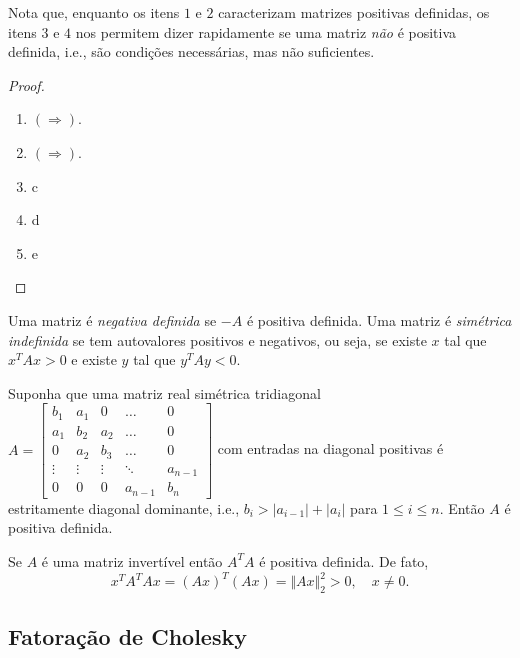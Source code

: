 \documentclass{article}
\begin{document}
Nota que, enquanto os itens \(1\) e \(2\) caracterizam matrizes positivas definidas, os itens \(3\) e \(4\) nos permitem dizer rapidamente se uma matriz \emph{não} é positiva definida, i.e., são condições necessárias, mas não suficientes.

\begin{proof}
    \begin{enumerate}
        \item \((\Rightarrow)\).
        \item \((\Rightarrow)\). 
        \item c
        \item d
        \item e
    \end{enumerate}
\end{proof}

\begin{rem}
    Uma matriz é \emph{negativa definida} se \(-A\) é positiva definida. Uma matriz é \emph{simétrica indefinida} se tem autovalores positivos e negativos, ou seja, se existe \(x\) tal que \(x^T A x > 0\) e existe \(y\) tal que \(y^T A y < 0\).
\end{rem}

\begin{thm}
    Suponha que uma matriz real simétrica tridiagonal \(\displaystyle A = \begin{bmatrix}
        b_1 & a_1 & 0 & \ldots & 0 \\
        a_1 & b_2 & a_2 & \ldots & 0 \\
        0 & a_2 & b_3 & \ldots & 0 \\
        \vdots & \vdots & \vdots & \ddots & a_{n-1} \\
        0 & 0 & 0 & a_{n-1} & b_n
    \end{bmatrix}\) com entradas na diagonal positivas é estritamente diagonal dominante, i.e., \(b_i > |a_{i-1}| + |a_i|\) para \(1 \leq i \leq n\). Então \(A\) é positiva definida.
\end{thm}

\begin{rem}
    Se \(A\) é uma matriz invertível então \(A^T A\) é positiva definida. De fato,
\[
    x^T A^T A x = (Ax)^T (Ax) = \Vert Ax \Vert_2^2 > 0, \quad x \neq 0.
\]
\end{rem}

\subsection{Fatoração de Cholesky}
\end{document}
